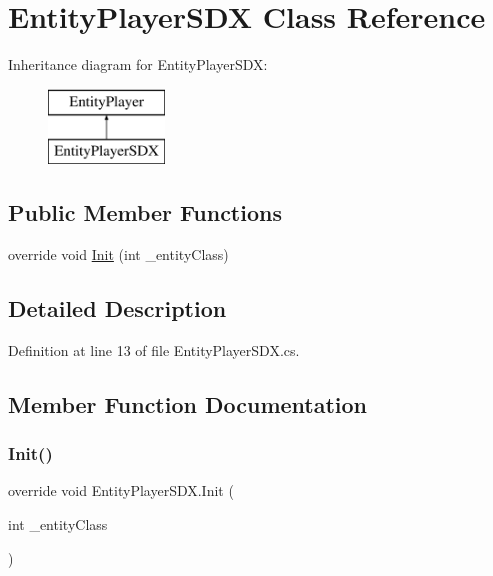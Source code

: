 \hypertarget{class_entity_player_s_d_x}{}\section{Entity\+Player\+S\+DX Class Reference}
\label{class_entity_player_s_d_x}
Inheritance diagram for Entity\+Player\+S\+DX\+:\begin{figure}[H]
\begin{center}
\leavevmode
\includegraphics[height=2.000000cm]{d4/d84/class_entity_player_s_d_x}
\end{center}
\end{figure}
\subsection*{Public Member Functions}
\begin{DoxyCompactItemize}
\item 
override void \mbox{\hyperlink{class_entity_player_s_d_x_a3ca3a3501b3ecb215501b3c685f3da08}{Init}} (int \+\_\+entity\+Class)
\end{DoxyCompactItemize}


\subsection{Detailed Description}


Definition at line 13 of file Entity\+Player\+S\+D\+X.\+cs.



\subsection{Member Function Documentation}
\mbox{\label{class_entity_player_s_d_x_a3ca3a3501b3ecb215501b3c685f3da08}} 
\subsubsection{\texorpdfstring{Init()}{Init()}}
{\footnotesize\ttfamily override void Entity\+Player\+S\+D\+X.\+Init (\begin{DoxyParamCaption}\item[{int}]{\+\_\+entity\+Class }\end{DoxyParamCaption})}




